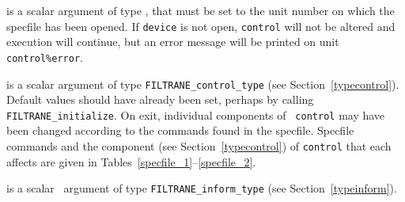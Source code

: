\documentclass{galahad}
\newcommand{\packagename}{FILTRANE}
\begin{document}
\begin{description}
 is a scalar \intentin argument of type \integer,
that must be set to the unit number on which the specfile
has been opened. If {\tt device} is not open, {\tt control} will
not be altered and execution will continue, but an error message
will be printed on unit {\tt control\%error}.

 is a scalar \intentinout argument of type 
{\tt \packagename\_control\_type} (see Section~\ref{typecontrol}). 
Default values should have already been set, perhaps by calling 
{\tt \packagename\_initialize}. On exit, individual components of {\tt
control} may have been changed according to the commands found in the
specfile. Specfile commands and  the component (see Section~\ref{typecontrol})
of {\tt control}  that each affects are given in
Tables~\ref{specfile_1}--\ref{specfile_2}.

 is a scalar \intentout\ argument of type 
{\tt \packagename\_inform\_type} (see Section~\ref{typeinform}).
\end{description}
\end{document}
